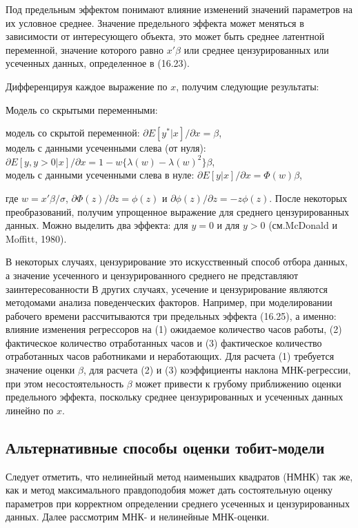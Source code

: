 Под предельным эффектом понимают влияние изменений значений параметров на их условное среднее. Значение предельного эффекта может меняться в зависимости от интересующего объекта, это может быть среднее латентной переменной, значение которого равно $x'\beta$ или среднее цензурированных или усеченных данных, определенное в (16.23).

Дифференцируя каждое выражение по $x$, получим следующие результаты:

Модель со скрытыми переменными: 


модель со скрытой переменной: $\partial E[y^{*}|x]/{\partial{x}}=\beta$, \\
модель с данными усеченными слева (от нуля): $\partial{E}[y,y>0|x]/{\partial}x={1-w\lbrace\lambda}(w)-\lambda(w)^2\rbrace\beta$, \\
модель с данными усеченными слева в нуле: $\partial E[y|x]/\partial x=\Phi(w)\beta$, 



где $w=x'\beta/\sigma$, $\partial\Phi(z)/\partial{z}=\phi(z)$ и $\partial\phi(z)/\partial{z}=-z\phi{(z)}$. После некоторых преобразований, получим упрощенное выражение для среднего цензурированных данных. Можно выделить два эффекта: для $y=0$ и для $y>0$ (см.McDonald и Moffitt, 1980).

В некоторых случаях, цензурирование это искусственный способ отбора данных, а значение усеченного и цензурированного среднего не представляют заинтересованности 
В других случаях, усечение и цензурирование являются методомами анализа поведенческих факторов. Например, при моделировании рабочего времени рассчитываются три предельных эффекта (16.25), а именно: влияние изменения регрессоров на (1) ожидаемое количество часов работы, (2) фактическое количество отработанных часов и (3) фактическое количество отработанных часов работниками и неработающих. Для расчета (1) требуется значение оценки $\beta$, для расчета (2) и (3) коэффициенты наклона МНК-регрессии, при этом несостоятельность $\beta$ может привести к грубому приближению оценки предельного эффекта, поскольку среднее цензурированных и усеченных данных линейно по $x$.

\subsection{Альтернативные способы оценки тобит-модели}

Следует отметить, что нелинейный метод наименьших квадратов (НМНК) так же, как и метод максимального правдоподобия может дать состоятельную оценку параметров при корректном определении среднего усеченных и цензурированных данных. Далее рассмотрим МНК- и нелинейные МНК-оценки.

